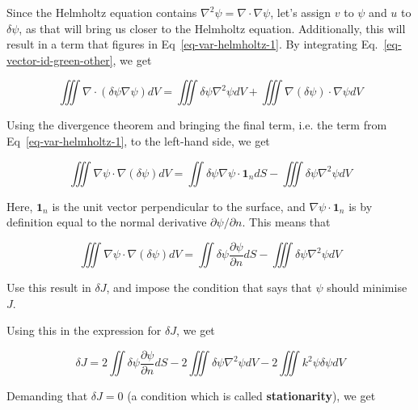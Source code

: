 Since the Helmholtz equation contains $\nabla^2 \psi = \nabla \cdot \nabla \psi$, let's assign $v$ to $\psi$ and $u$ to $\delta \psi$, as that will bring us closer to the Helmholtz equation. Additionally, this will result in a term that figures in Eq~\ref{eq-var-helmholtz-1}. By integrating Eq.~\ref{eq-vector-id-green-other}, we get

\begin{equation}
  \iiint  \nabla \cdot (\delta \psi \nabla \psi) dV =  \iiint \delta \psi  \nabla^2 \psi dV + 
  \iiint  \nabla (\delta \psi) \cdot \nabla \psi  dV  
\end{equation} 

Using the divergence theorem and bringing the final term, i.e. the term from Eq~\ref{eq-var-helmholtz-1}, to the left-hand side, we get

\begin{equation}
\iiint \nabla \psi \cdot \nabla (\delta \psi) dV = \iint \delta \psi {\nabla \psi} \cdot \mathbf{1}_n dS - \iiint \delta \psi \nabla^2 \psi dV
\end{equation} 

Here, $\mathbf{1}_n$ is the unit vector perpendicular to the surface, and ${\nabla \psi} \cdot \mathbf{1}_n $ is by definition equal to the normal derivative ${\partial \psi} / {\partial n}$. This means that

\begin{equation}
  \iiint \nabla \psi \cdot \nabla (\delta \psi) dV = \iint \delta \psi  \frac{\partial \psi}{\partial n} dS - \iiint \delta \psi \nabla^2 \psi dV
  \end{equation} 

\noindent{}

\begin{cue}
Use this result in $\delta J$, and impose the condition that says that $\psi$ should minimise $J$.  
\end{cue}

Using this in the expression for $\delta J$, we get

\begin{equation}
\delta J = 2\iint \delta \psi  \frac{\partial \psi}{\partial n} dS - 2\iiint \delta \psi  \nabla^2 \psi dV - 2 \iiint k^2 \psi \delta \psi dV
\end{equation} 

Demanding that $\delta J = 0$ (a condition which is called \textbf{stationarity}), we get

